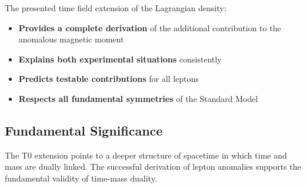 \documentclass[12pt,a4paper]{article}
\theoremstyle{definition}
\begin{document}
	The presented time field extension of the Lagrangian density:
	
	\begin{itemize}
		\item \textbf{Provides a complete derivation} of the additional contribution to the anomalous magnetic moment
		\item \textbf{Explains both experimental situations} consistently
		\item \textbf{Predicts testable contributions} for all leptons
		\item \textbf{Respects all fundamental symmetries} of the Standard Model
	\end{itemize}
	
	\subsection{Fundamental Significance}
	
	The T0 extension points to a deeper structure of spacetime in which time and mass are dually linked. The successful derivation of lepton anomalies supports the fundamental validity of time-mass duality.
	
\end{document}

